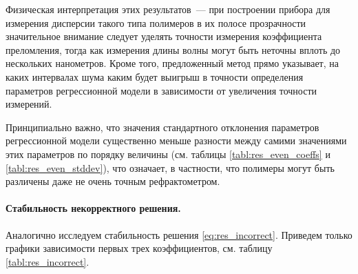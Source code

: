 \documentclass[11pt,a4paper]{article}
\theoremstyle{definition}
\begin{document}
Физическая интерпретация этих результатов~--- при построении прибора для измерения дисперсии
такого типа полимеров в их полосе прозрачности значительное внимание следует уделять точности измерения коэффициента преломления,
тогда как измерения длины волны могут быть неточны вплоть до нескольких нанометров. Кроме того,
предложенный метод прямо указывает, на каких интервалах шума каким будет выигрыш в точности
определения параметров регрессионной модели в зависимости от увеличения точности измерений.

Принципиально важно, что значения стандартного отклонения параметров регрессионной
модели существенно меньше разности между самими значениями этих параметров по порядку величины
(см. таблицы \ref{tabl:res_even_coeffs} и \ref{tabl:res_even_stddev}), что означает, в частности,
что полимеры могут быть различены даже не очень точным рефрактометром.

\paragraph{Стабильность некорректного решения.}

Аналогично исследуем стабильность решения \eqref{eq:res_incorrect}. Приведем только графики
зависимости первых трех коэффициентов, см. таблицу \ref{tabl:res_incorrect}.
\end{document}
